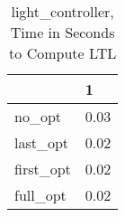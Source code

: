 \begin{table}
\caption{light\_controller, Time in Seconds to Compute LTL}
\label{light_controller_LTL_time}
\begin{tabular}{ll}
\toprule
 & 1 \\
\midrule
no\_opt & 0.03 \\
last\_opt & 0.02 \\
first\_opt & 0.02 \\
full\_opt & 0.02 \\
\bottomrule
\end{tabular}
\end{table}
